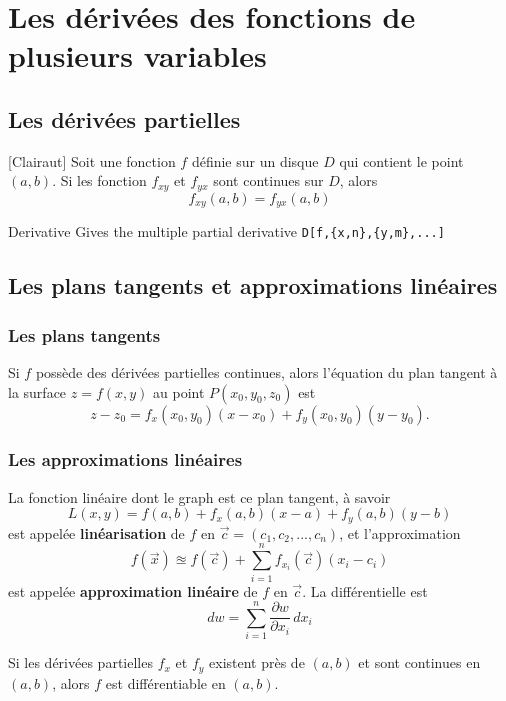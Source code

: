 \section{Les dérivées des fonctions de plusieurs variables}
	\subsection{Les dérivées partielles}
		\begin{mythm}[Clairaut]
			Soit une fonction $f$ définie sur un disque $D$ qui contient le point $(a,b)$. Si les fonction $f_{xy}$ et $f_{yx}$ sont continues sur $D$, alors \[f_{xy}(a,b)=f_{yx}(a,b)\]
		\end{mythm}
		\begin{code}{Derivative}
		Gives the multiple partial derivative \verb|D[f,{x,n},{y,m},...]|
	\end{code}
	\subsection{Les plans tangents et approximations linéaires}
		\subsubsection*{Les plans tangents}
			\begin{mydef}
					Si $f$ possède des dérivées partielles continues, alors l'équation du plan tangent à la surface $z=f(x,y)$ au point $P(x_0,y_0,z_0)$ est \[z-z_0=f_x(x_0,y_0)(x-x_0)+f_y(x_0,y_0)(y-y_0).\]
			\end{mydef}
		\subsubsection*{Les approximations linéaires}
			\begin{mydef}
				La fonction linéaire dont le graph est ce plan tangent, à savoir \[L(x,y)=f(a,b)+f_x(a,b)(x-a)+f_y(a,b)(y-b)\]
				est appelée \textbf{linéarisation} de $f$ en $\vec{c}=(c_1,c_2,...,c_n)$, et l'approximation
				\[f(\vec{x})\approxeq f(\vec{c})+\sum_{i=1}^n f_{x_i}(\vec{c})(x_i-c_i)\]
				est appelée \textbf{approximation linéaire} de $f$ en $\vec{c}$. La différentielle est \[dw=\sum_{i=1}^{n}\frac{\partial w}{\partial x_i}\,dx_i\]
			\end{mydef}
			\begin{mythm}
				Si les dérivées partielles $f_x$ et $f_y$ existent près de $(a,b)$ et sont continues en $(a,b)$, alors $f$ est différentiable en $(a,b)$.
			\end{mythm}
